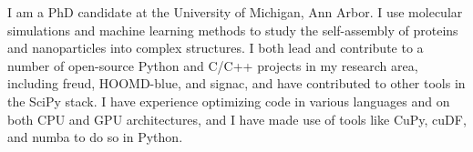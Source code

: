 
\begin{cvparagraph}
I am a PhD candidate at the University of Michigan, Ann Arbor.
I use molecular simulations and machine learning methods to study the self-assembly of proteins and nanoparticles into complex structures.
I both lead and contribute to a number of open-source Python and C/C++ projects in my research area, including freud, HOOMD-blue, and signac, and have contributed to other tools in the SciPy stack.
I have experience optimizing code in various languages and on both CPU and GPU architectures, and I have made use of tools like CuPy, cuDF, and numba to do so in Python.
\end{cvparagraph}
